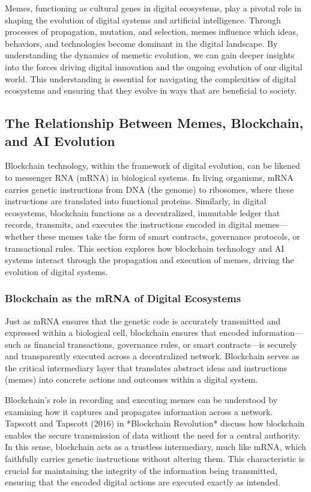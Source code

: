 \documentclass[12pt,twoside]{article}
\begin{document}
Memes, functioning as cultural genes in digital ecosystems, play a pivotal role in shaping the evolution of digital systems and artificial intelligence. Through processes of propagation, mutation, and selection, memes influence which ideas, behaviors, and technologies become dominant in the digital landscape. By understanding the dynamics of memetic evolution, we can gain deeper insights into the forces driving digital innovation and the ongoing evolution of our digital world. This understanding is essential for navigating the complexities of digital ecosystems and ensuring that they evolve in ways that are beneficial to society.

\subsection{The Relationship Between Memes, Blockchain, and AI Evolution}

Blockchain technology, within the framework of digital evolution, can be likened to messenger RNA (mRNA) in biological systems. In living organisms, mRNA carries genetic instructions from DNA (the genome) to ribosomes, where these instructions are translated into functional proteins. Similarly, in digital ecosystems, blockchain functions as a decentralized, immutable ledger that records, transmits, and executes the instructions encoded in digital memes—whether these memes take the form of smart contracts, governance protocols, or transactional rules. This section explores how blockchain technology and AI systems interact through the propagation and execution of memes, driving the evolution of digital systems.

\subsubsection{Blockchain as the mRNA of Digital Ecosystems}

Just as mRNA ensures that the genetic code is accurately transmitted and expressed within a biological cell, blockchain ensures that encoded information—such as financial transactions, governance rules, or smart contracts—is securely and transparently executed across a decentralized network. Blockchain serves as the critical intermediary layer that translates abstract ideas and instructions (memes) into concrete actions and outcomes within a digital system.

Blockchain’s role in recording and executing memes can be understood by examining how it captures and propagates information across a network. Tapscott and Tapscott (2016) in *Blockchain Revolution* discuss how blockchain enables the secure transmission of data without the need for a central authority. In this sense, blockchain acts as a trustless intermediary, much like mRNA, which faithfully carries genetic instructions without altering them. This characteristic is crucial for maintaining the integrity of the information being transmitted, ensuring that the encoded digital actions are executed exactly as intended.
\end{document}
